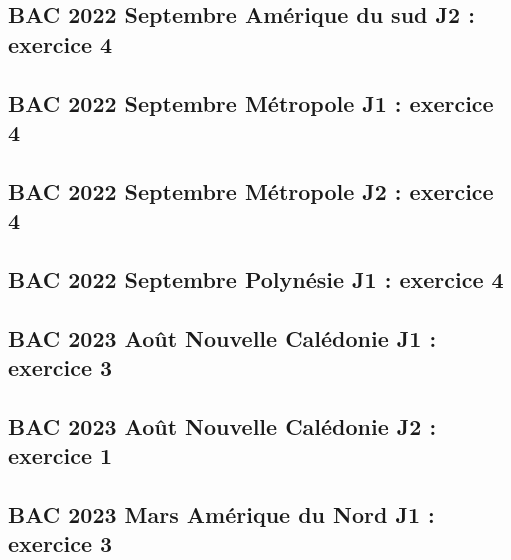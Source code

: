 \documentclass[lang=fr,edition=teacher,layout=sheet]{mxbook}
\begin{document}
\begingroup\endgroup
\par\bigskip
{}\subsection*{BAC 2022 Septembre Amérique du sud J2 : exercice 4}
\begingroup\endgroup
\par\bigskip
{}\subsection*{BAC 2022 Septembre Métropole J1 : exercice 4}
\begingroup\endgroup
\par\bigskip
{}\subsection*{BAC 2022 Septembre Métropole J2 : exercice 4}
\begingroup\endgroup
\par\bigskip
{}\subsection*{BAC 2022 Septembre Polynésie J1 : exercice 4}
\begingroup\endgroup
\par\bigskip
{}\subsection*{BAC 2023 Août Nouvelle Calédonie J1 : exercice 3}
\begingroup\endgroup
\par\bigskip
{}\subsection*{BAC 2023 Août Nouvelle Calédonie J2 : exercice 1}
\begingroup\endgroup
\par\bigskip
{}\subsection*{BAC 2023 Mars Amérique du Nord J1 : exercice 3}
\end{document}

